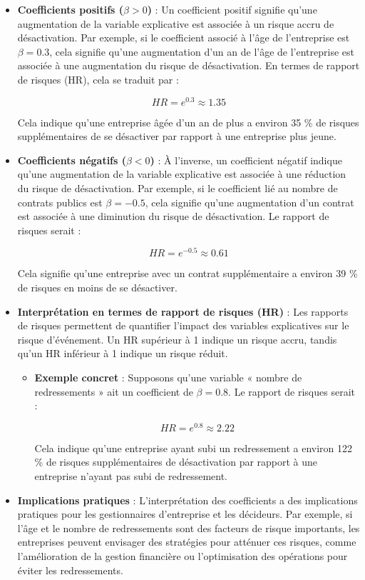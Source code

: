 \documentclass[a4paper,12pt]{report}
\begin{document}
\begin{itemize}
    \item \textbf{Coefficients positifs (\( \beta > 0 \))} : Un coefficient positif signifie qu'une augmentation de la variable explicative est associée à un risque accru de désactivation. Par exemple, si le coefficient associé à l'âge de l'entreprise est \( \beta = 0.3 \), cela signifie qu'une augmentation d'un an de l'âge de l'entreprise est associée à une augmentation du risque de désactivation. En termes de rapport de risques (HR), cela se traduit par :
    
    \[
    HR = e^{0.3} \approx 1.35
    \]
    
    Cela indique qu'une entreprise âgée d'un an de plus a environ 35 \% de risques supplémentaires de se désactiver par rapport à une entreprise plus jeune.

    \item \textbf{Coefficients négatifs (\( \beta < 0 \))} : À l'inverse, un coefficient négatif indique qu'une augmentation de la variable explicative est associée à une réduction du risque de désactivation. Par exemple, si le coefficient lié au nombre de contrats publics est \( \beta = -0.5 \), cela signifie qu'une augmentation d'un contrat est associée à une diminution du risque de désactivation. Le rapport de risques serait :
    
    \[
    HR = e^{-0.5} \approx 0.61
    \]
    
    Cela signifie qu'une entreprise avec un contrat supplémentaire a environ 39 \% de risques en moins de se désactiver.

    \item \textbf{Interprétation en termes de rapport de risques (HR)} : Les rapports de risques permettent de quantifier l'impact des variables explicatives sur le risque d'événement. Un HR supérieur à 1 indique un risque accru, tandis qu'un HR inférieur à 1 indique un risque réduit.
    
    \begin{itemize}
        \item \textbf{Exemple concret} : Supposons qu'une variable « nombre de redressements » ait un coefficient de \( \beta = 0.8 \). Le rapport de risques serait :
        
        \[
        HR = e^{0.8} \approx 2.22
        \]
        
        Cela indique qu'une entreprise ayant subi un redressement a environ 122 \% de risques supplémentaires de désactivation par rapport à une entreprise n'ayant pas subi de redressement.
    \end{itemize}

    \item \textbf{Implications pratiques} : L'interprétation des coefficients a des implications pratiques pour les gestionnaires d'entreprise et les décideurs. Par exemple, si l'âge et le nombre de redressements sont des facteurs de risque importants, les entreprises peuvent envisager des stratégies pour atténuer ces risques, comme l'amélioration de la gestion financière ou l'optimisation des opérations pour éviter les redressements.
\end{itemize}
\end{document}
